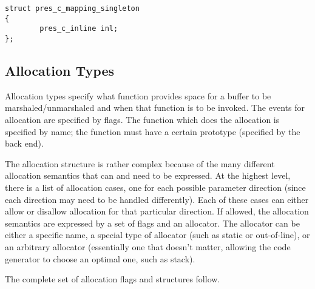 \begin{verbatim}
struct pres_c_mapping_singleton
{
        pres_c_inline inl;
};
\end{verbatim}



\subsection{Allocation Types}
\label{subsec:PRESC:Allocation Types}

Allocation types specify what function provides space for a buffer to be
marshaled/unmarshaled and when that function is to be invoked.  The events for
allocation are specified by flags.  The function which does the allocation is
specified by name; the function must have a certain prototype (specified by the
back end).

The allocation structure is rather complex because of the many different
allocation semantics that can and need to be expressed.  At the highest level,
there is a list of allocation cases, one for each possible parameter direction
(since each direction may need to be handled differently).  Each of these cases
can either allow or disallow allocation for that particular direction.  If
allowed, the allocation semantics are expressed by a set of flags and an
allocator.  The allocator can be either a specific name, a special type of
allocator (such as static or out-of-line), or an arbitrary allocator
(essentially one that doesn't matter, allowing the code generator to choose an
optimal one, such as stack).

The complete set of allocation flags and structures follow.

